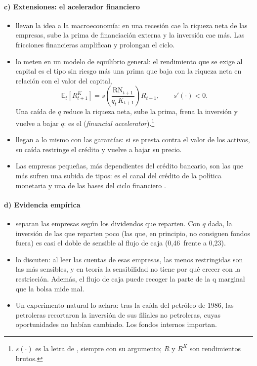 \documentclass[11pt]{article}
\begin{document}
\paragraph{c) Extensiones: el acelerador financiero}

\begin{itemize}
\item \textcite{BernankeGertler1989Agency} llevan la idea a la macroeconomía: en una recesión cae la riqueza neta de las empresas, sube la prima de financiación externa y la inversión cae más. Las fricciones financieras amplifican y prolongan el ciclo.
\item \textcite{BernankeGertlerGilchrist1999} lo meten en un modelo de equilibrio general: el rendimiento que se exige al capital es el tipo sin riesgo más una prima que baja con la riqueza neta en relación con el valor del capital,
  \begin{equation*}
  \mathbb{E}_t\left[R^K_{t+1}\right]=s\left(\frac{\mathrm{RN}_{t+1}}{q_t\,K_{t+1}}\right)R_{t+1},\qquad s'(\cdot)<0.
  \end{equation*}
  Una caída de $q$ reduce la riqueza neta, sube la prima, frena la inversión y vuelve a bajar $q$: es el  (\emph{financial accelerator}).\footnote{$s(\cdot)$ es la letra de \textcite{BernankeGertlerGilchrist1999}, siempre con su argumento; $R$ y $R^K$ son rendimientos brutos.}
\item \textcite{KiyotakiMoore1997Credit} llegan a lo mismo con las garantías: si se presta contra el valor de los activos, su caída restringe el crédito y vuelve a bajar su precio.
\item Las empresas pequeñas, más dependientes del crédito bancario, son las que más sufren una subida de tipos\nocite{GertlerGilchrist1994Monetary}: es el canal del crédito de la política monetaria  y una de las bases del ciclo financiero .
\end{itemize}

\paragraph{d) Evidencia empírica}

\begin{itemize}
\item \textcite{FazzariHubbardPetersen1988} separan las empresas según los dividendos que reparten. Con $q$ dada, la inversión de las que reparten poco (las que, en principio, no consiguen fondos fuera) es casi el doble de sensible al flujo de caja (0,46~frente a 0,23).
\item \textcite{KaplanZingales1997} lo discuten: al leer las cuentas de esas empresas, las menos restringidas son las más sensibles, y en teoría la sensibilidad no tiene por qué crecer con la restricción. Además, el flujo de caja puede recoger la parte de la q marginal que la bolsa mide mal\nocite{EricksonWhited2000Measurement}.
\item Un experimento natural lo aclara: tras la caída del petróleo de 1986, las petroleras recortaron la inversión de sus filiales no petroleras, cuyas oportunidades no habían cambiado. Los fondos internos importan\nocite{Lamont1997Cash}.
\end{itemize}
\end{document}
